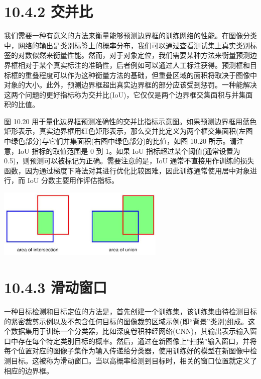 \documentclass[10pt]{report}
\begin{document}
\section*{10.4.2 交并比}

我们需要一种有意义的方法来衡量能够预测边界框的训练网络的性能。在图像分类中，网络的输出是类别标签上的概率分布，我们可以通过查看测试集上真实类别标签的对数似然来衡量性能。然而，对于对象定位，我们需要某种方法来衡量预测边界框相对于某个真实标注的准确性，后者例如可以通过人工标注获得。预测框和目标框的重叠程度可以作为这种衡量方法的基础，但重叠区域的面积将取决于图像中对象的大小。此外，预测边界框超出真实边界框的部分应该受到惩罚。一种能解决这两个问题的更好指标称为交并比(IoU)，它仅仅是两个边界框交集面积与并集面积的比值。

图 10.20 用于量化边界框预测准确性的交并比指标示意图。如果预测边界框用蓝色矩形表示，真实边界框用红色矩形表示，那么交并比定义为两个框交集面积(左图中绿色部分)与它们并集面积(右图中绿色部分)的比值，如图 10.20 所示。请注意，IoU 指标的取值范围是 0 到 1。如果 IoU 指标超过某个阈值(通常设置为 0.5)，则预测可以被标记为正确。需要注意的是，IoU 通常不直接用作训练的损失函数，因为通过梯度下降法对其进行优化比较困难，因此训练通常使用居中对象进行，而 IoU 分数主要用作评估指标。

\begin{center}
\includegraphics[max width=0.6\textwidth]{images/0194e279-9b28-703a-88f4-c3ac21e2010d_330_708_342_845_350_0.jpg}
\end{center}
\hspace*{3em} 

\section*{10.4.3 滑动窗口}

一种目标检测和目标定位的方法是，首先创建一个训练集，该训练集由待检测目标的紧密裁剪示例以及不包含任何目标的图像裁剪区域示例(即“背景”类别)组成。这个数据集用于训练一个分类器，比如深度卷积神经网络(CNN)，其输出表示输入窗口中存在每个特定类别目标的概率。然后，通过在新图像上“扫描”输入窗口，并将每个位置对应的图像子集作为输入传递给分类器，使用训练好的模型在新图像中检测目标。这被称为滑动窗口。当以高概率检测到目标时，相关的窗口位置就定义了相应的边界框。
\end{document}
